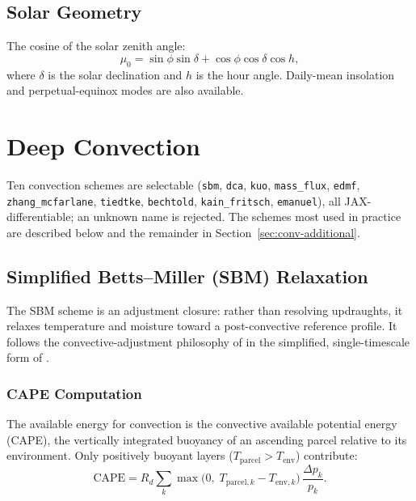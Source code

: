 \documentclass[11pt,twoside]{report}
\newcommand{\Rd}{R_d}
\begin{document}
\subsection{Solar Geometry}

The cosine of the solar zenith angle:
\begin{equation}
  \mu_0 = \sin\phi\sin\delta + \cos\phi\cos\delta\cos h,
\end{equation}
where $\delta$ is the solar declination and $h$ is the hour angle.
Daily-mean insolation and perpetual-equinox modes are also available.


\section{Deep Convection}
\label{sec:convection}

Ten convection schemes are selectable (\texttt{sbm}, \texttt{dca},
\texttt{kuo}, \texttt{mass\_flux}, \texttt{edmf}, \texttt{zhang\_mcfarlane},
\texttt{tiedtke}, \texttt{bechtold}, \texttt{kain\_fritsch},
\texttt{emanuel}), all JAX-differentiable; an unknown name is rejected.  The
schemes most used in practice are described below and the remainder in
Section~\ref{sec:conv-additional}.

\subsection{Simplified Betts--Miller (SBM) Relaxation}
\label{sec:sbm}

The SBM scheme is an adjustment closure: rather than resolving updraughts, it
relaxes temperature and moisture toward a post-convective reference profile.
It follows the convective-adjustment philosophy of \citet{BettsMiller1986} in
the simplified, single-timescale form of \citet{Frierson2007}.

\subsubsection{CAPE Computation}

The available energy for convection is the convective available potential
energy (CAPE), the vertically integrated buoyancy of an ascending parcel
relative to its environment. Only positively buoyant layers
($T_{\mathrm{parcel}}>T_{\mathrm{env}}$) contribute:
\begin{equation}
  \mathrm{CAPE} = \Rd\sum_k
  \max\!\bigl(0,\;T_{\mathrm{parcel},k}-T_{\mathrm{env},k}\bigr)\,
  \frac{\Delta p_k}{p_k}.
\end{equation}
\end{document}
